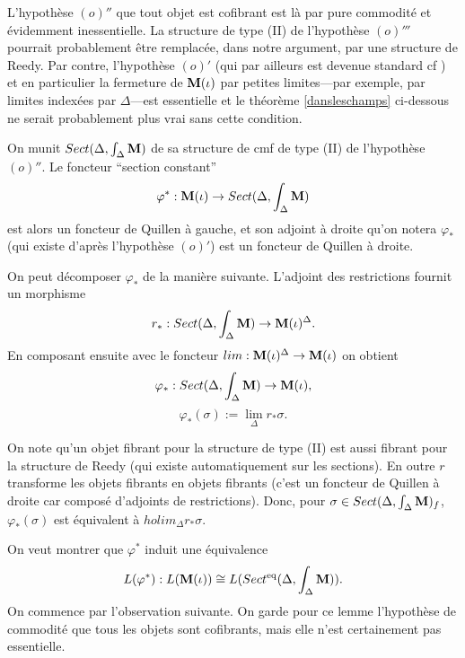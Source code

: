 \documentclass[12pt]{article}
\newcommand{\mm}{{\bf M}}
\begin{document}
L'hypoth\`ese $(o)''$ que tout objet est cofibrant est l\`a par pure
commodit\'e et \'evidemment inessentielle. La structure de type (II)
de l'hypoth\`ese $(o)'''$ pourrait probablement \^etre remplac\'ee, dans
notre argument, par  une structure de Reedy. Par contre, l'hypoth\`ese $(o)'$
(qui par ailleurs est devenue standard
cf \cite{Hirschhorn} \cite{DHK} \cite{HoveyBook})
et en particulier la fermeture de $\mm (\iota )$ par petites limites---par
exemple, par limites index\'ees par $\Delta$---est essentielle et le
th\'eor\`eme
\ref{dansleschamps} ci-dessous ne serait probablement plus vrai sans
cette condition.

On munit $Sect (\Delta , \int _{\Delta} \mm )$ de sa
structure de cmf de type (II) de l'hypoth\`ese $(o)''$.
Le foncteur ``section
constant''
$$
\varphi ^{\ast} : \mm (\iota )\rightarrow Sect (\Delta , \int _{\Delta} \mm )
$$
est alors un foncteur de Quillen \`a gauche, et son adjoint \`a droite
qu'on notera $\varphi _{\ast}$ (qui existe d'apr\`es l'hypoth\`ese $(o)'$)
est un foncteur de Quillen \`a droite.

On peut d\'ecomposer $\varphi _{\ast}$ de la mani\`ere suivante. L'adjoint des
restrictions fournit un morphisme
$$
r_{\ast}:Sect (\Delta , \int _{\Delta} \mm )\rightarrow \mm (\iota )^{\Delta}.
$$
En composant
ensuite avec le foncteur $lim : \mm (\iota )^{\Delta} \rightarrow \mm (\iota
)$  on obtient
$$
\varphi _{\ast} : Sect (\Delta , \int _{\Delta} \mm )\rightarrow \mm (\iota ),
$$
$$
\varphi _{\ast} (\sigma ) := \lim _{\Delta} r_{\ast}\sigma .
$$

On note qu'un objet fibrant pour la structure de type (II) est aussi fibrant
pour la structure de Reedy (qui existe automatiquement sur les sections).
En outre $r$ transforme les objets fibrants en objets fibrants
(c'est un foncteur de Quillen \`a droite car compos\'e d'adjoints de
restrictions).  Donc, pour $\sigma \in Sect (\Delta , \int _{\Delta} \mm )_f$,
$\varphi _{\ast} (\sigma )$ est \'equivalent \`a  $holim _{\Delta}r_{\ast}\sigma $.


On veut montrer que $\varphi ^{\ast}$ induit une \'equivalence
$$
L(\varphi ^{\ast} ): L(\mm (\iota ))\cong
L(Sect ^{\rm eq}(\Delta , \int _{\Delta} \mm )).
$$
On commence par l'observation suivante. On garde pour ce lemme l'hypoth\`ese de
commodit\'e que tous les objets sont cofibrants, mais elle n'est
certainement pas essentielle.
\end{document}
